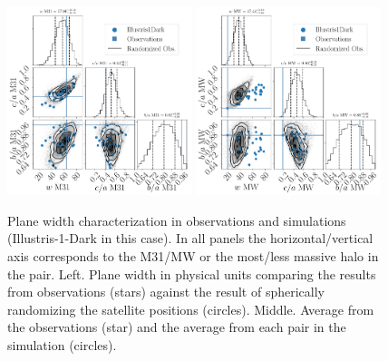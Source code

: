 \documentclass[a4paper,fleqn,usenatbib]{mnras}
\begin{document}
\begin{figure}
\centering
\includegraphics[width=0.48\textwidth]{input_illustris1dark_obs_M31_n_11.pdf}
\includegraphics[width=0.48\textwidth]{input_illustris1dark_obs_MW_n_11.pdf}
\caption{Plane width characterization in observations and
  simulations (Illustris-1-Dark in this case). In all panels the
  horizontal/vertical axis corresponds to the  M31/MW or the
  most/less massive halo in the pair. 
  Left. Plane width in physical units comparing the results from observations
(stars) against the result of spherically randomizing the satellite
positions (circles). 
Middle. Average from the observations (star) and the average from each
pair in the simulation (circles).}
\end{figure}
\end{document}
